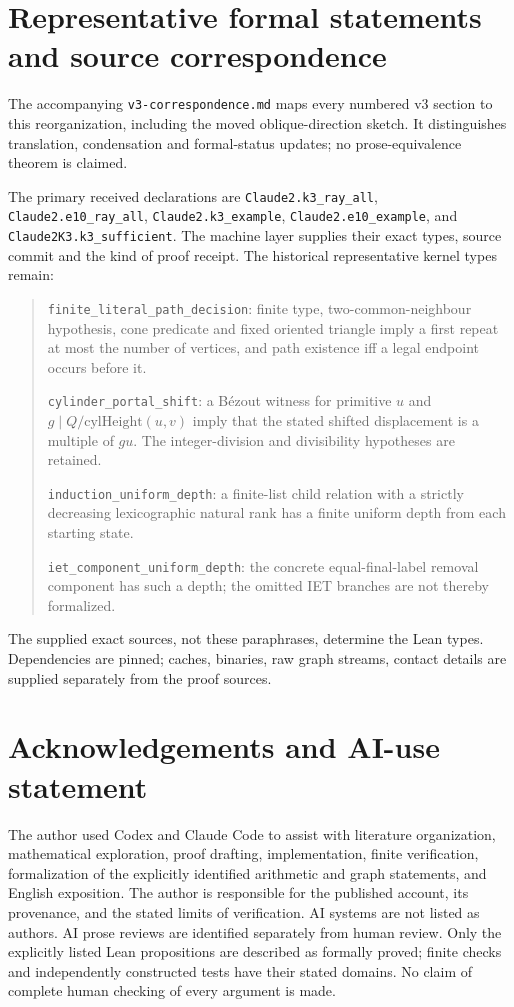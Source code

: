 \documentclass[11pt]{amsart}
\newcommand{\record}[1]{\nolinkurl{#1}}
\theoremstyle{definition}\newtheorem{definition}{Definition}
\begin{document}
\section{Representative formal statements and source correspondence}\label{app:correspondence}
The accompanying \record{v3-correspondence.md} maps every numbered v3
section to this reorganization, including the moved oblique-direction
sketch. It distinguishes translation, condensation and formal-status
updates; no prose-equivalence theorem is claimed.

The primary received declarations are
\record{Claude2.k3_ray_all}, \record{Claude2.e10_ray_all},
\record{Claude2.k3_example}, \record{Claude2.e10_example}, and
\record{Claude2K3.k3_sufficient}. The machine layer supplies their exact
types, source commit and the kind of proof receipt. The historical
representative kernel types remain:
\begin{quote}\small
\record{finite_literal_path_decision}: finite type, two-common-neighbour
hypothesis, cone predicate and fixed oriented triangle imply a first
repeat at most the number of vertices, and path existence iff a legal
endpoint occurs before it.\par
\record{cylinder_portal_shift}: a B\'ezout witness for primitive $u$
and $g\mid Q/\mathrm{cylHeight}(u,v)$ imply that the stated shifted
displacement is a multiple of $gu$. The integer-division and
divisibility hypotheses are retained.\par
\record{induction_uniform_depth}: a finite-list child relation with a
strictly decreasing lexicographic natural rank has a finite uniform
depth from each starting state.\par
\record{iet_component_uniform_depth}: the concrete equal-final-label
removal component has such a depth; the omitted IET branches are not
thereby formalized.
\end{quote}
The supplied exact sources, not these paraphrases, determine the Lean
types. Dependencies are pinned; caches, binaries, raw graph streams,
contact details are supplied separately from the proof sources.

\section*{Acknowledgements and AI-use statement}
The author used Codex and Claude Code
to assist with literature organization, mathematical exploration,
proof drafting, implementation, finite verification, formalization of
the explicitly identified arithmetic and graph statements, and English exposition. The author is responsible
for the published account, its provenance, and the stated limits of
verification. AI systems are not listed as authors. AI prose reviews
are identified separately from human review. Only the explicitly
listed Lean propositions are described as formally proved; finite
checks and independently constructed tests have their stated domains.
No claim of complete human checking of every argument is made.
\end{document}
